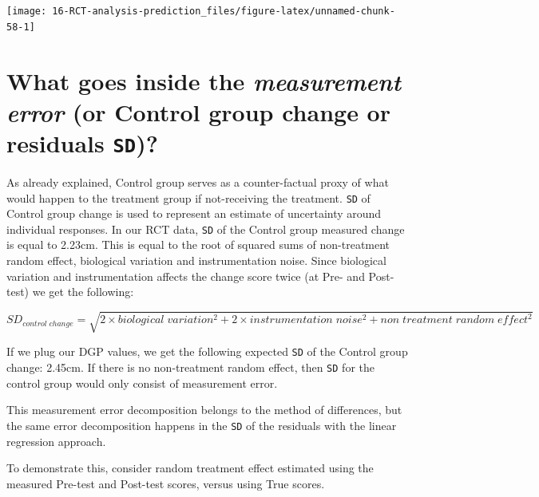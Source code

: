 \documentclass[
]{book}
\begin{document}
\begin{center}\texttt{[image: 16-RCT-analysis-prediction\_files/figure-latex/unnamed-chunk-58-1]} \end{center}

\hypertarget{what-goes-inside-the-measurement-error-or-control-group-change-or-residuals-sd}{%
\section{\texorpdfstring{What goes inside the \emph{measurement error} (or Control group change or residuals \texttt{SD})?}{What goes inside the measurement error (or Control group change or residuals SD)?}}\label{what-goes-inside-the-measurement-error-or-control-group-change-or-residuals-sd}}

As already explained, Control group serves as a counter-factual proxy of what would happen to the treatment group if not-receiving the treatment. \texttt{SD} of Control group change is used to represent an estimate of uncertainty around individual responses. In our RCT data, \texttt{SD} of the Control group measured change is equal to 2.23cm. This is equal to the root of squared sums of non-treatment random effect, biological variation and instrumentation noise. Since biological variation and instrumentation affects the change score twice (at Pre- and Post-test) we get the following:

\begin{equation}
  SD_{control\;change} = \sqrt{2\times biological\;variation^2 + 2\times instrumentation\;noise^2 + non\;treatment\;random\;effect^2}
\end{equation}

If we plug our DGP values, we get the following expected \texttt{SD} of the Control group change: 2.45cm. If there is no non-treatment random effect, then \texttt{SD} for the control group would only consist of measurement error.

This measurement error decomposition belongs to the method of differences, but the same error decomposition happens in the \texttt{SD} of the residuals with the linear regression approach.

To demonstrate this, consider random treatment effect estimated using the measured Pre-test and Post-test scores, versus using True scores.
\end{document}
